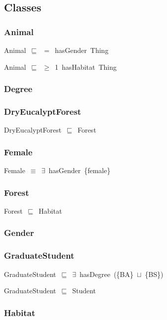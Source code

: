 \documentclass{article}
\begin{document}
\subsection*{Classes}

\subsubsection*{Animal}

Animal~\ensuremath{\sqsubseteq}~\ensuremath{=}~hasGender~Thing~

Animal~\ensuremath{\sqsubseteq}~\ensuremath{\geq}~1~hasHabitat~Thing~

\subsubsection*{Degree}

\subsubsection*{DryEucalyptForest}

DryEucalyptForest~\ensuremath{\sqsubseteq}~Forest~

\subsubsection*{Female}

Female~\ensuremath{\equiv}~\ensuremath{\exists}~hasGender~\{female\}

\subsubsection*{Forest}

Forest~\ensuremath{\sqsubseteq}~Habitat~

\subsubsection*{Gender}

\subsubsection*{GraduateStudent}

GraduateStudent~\ensuremath{\sqsubseteq}~\ensuremath{\exists}~hasDegree~(\{BA\}~\ensuremath{\sqcup}~\{BS\})~

GraduateStudent~\ensuremath{\sqsubseteq}~Student~

\subsubsection*{Habitat}
\end{document}
